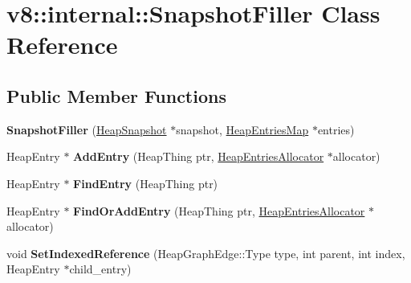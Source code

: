 \hypertarget{classv8_1_1internal_1_1_snapshot_filler}{}\section{v8\+:\+:internal\+:\+:Snapshot\+Filler Class Reference}
\label{classv8_1_1internal_1_1_snapshot_filler}
\subsection*{Public Member Functions}
\begin{DoxyCompactItemize}
\item 
\hypertarget{classv8_1_1internal_1_1_snapshot_filler_af5966d0560b75ba444ea1857103f992e}{}{\bfseries Snapshot\+Filler} (\hyperlink{classv8_1_1internal_1_1_heap_snapshot}{Heap\+Snapshot} $\ast$snapshot, \hyperlink{classv8_1_1internal_1_1_heap_entries_map}{Heap\+Entries\+Map} $\ast$entries)\label{classv8_1_1internal_1_1_snapshot_filler_af5966d0560b75ba444ea1857103f992e}

\item 
\hypertarget{classv8_1_1internal_1_1_snapshot_filler_ab9333ca4c5639e3fc871bc4ca1f085fd}{}Heap\+Entry $\ast$ {\bfseries Add\+Entry} (Heap\+Thing ptr, \hyperlink{classv8_1_1internal_1_1_heap_entries_allocator}{Heap\+Entries\+Allocator} $\ast$allocator)\label{classv8_1_1internal_1_1_snapshot_filler_ab9333ca4c5639e3fc871bc4ca1f085fd}

\item 
\hypertarget{classv8_1_1internal_1_1_snapshot_filler_a9959816c6a13c23f167634d9d03b379f}{}Heap\+Entry $\ast$ {\bfseries Find\+Entry} (Heap\+Thing ptr)\label{classv8_1_1internal_1_1_snapshot_filler_a9959816c6a13c23f167634d9d03b379f}

\item 
\hypertarget{classv8_1_1internal_1_1_snapshot_filler_a36cffb06d22463a9f5f2302c311aecb0}{}Heap\+Entry $\ast$ {\bfseries Find\+Or\+Add\+Entry} (Heap\+Thing ptr, \hyperlink{classv8_1_1internal_1_1_heap_entries_allocator}{Heap\+Entries\+Allocator} $\ast$allocator)\label{classv8_1_1internal_1_1_snapshot_filler_a36cffb06d22463a9f5f2302c311aecb0}

\item 
\hypertarget{classv8_1_1internal_1_1_snapshot_filler_a8fb7cc8fd0076b36d8de1db0ccbbdd72}{}void {\bfseries Set\+Indexed\+Reference} (Heap\+Graph\+Edge\+::\+Type type, int parent, int index, Heap\+Entry $\ast$child\+\_\+entry)\label{classv8_1_1internal_1_1_snapshot_filler_a8fb7cc8fd0076b36d8de1db0ccbbdd72}


\end{DoxyCompactItemize}
